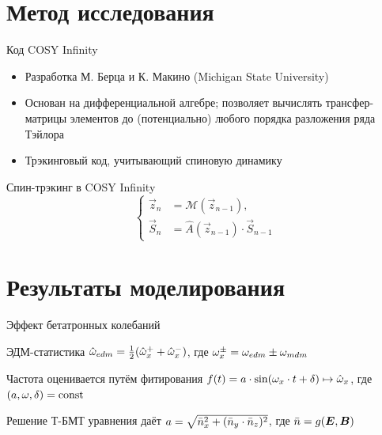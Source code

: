 \documentclass[14pt]{beamer}
\begin{document}
\section{Метод исследования}
\begin{frame}{Код COSY Infinity}
	\begin{itemize}
		\item Разработка М. Берца и К. Макино (Michigan State University)
		\item Основан на дифференциальной алгебре; позволяет вычислять трансфер-матрицы элементов до (потенциально) любого порядка разложения ряда Тэйлора
		\item Трэкинговый код, учитывающий спиновую динамику
	\end{itemize}
\end{frame}
\begin{frame}{Спин-трэкинг в COSY Infinity} 
	\[
	\begin{cases}
	\vec{z}_n &= \mathcal{M}(\vec{z}_{n-1}), \\
	\vec{S}_n &= \hat A(\vec z_{n-1})\cdot \vec S_{n-1}
	\end{cases}
	\]
\end{frame}

\section{Результаты моделирования}
\begin{frame}{Эффект бетатронных колебаний}
\begin{block}{ЭДМ-статистика}
	$\hat{\omega}_{edm} = \frac12(\hat{\omega}_x^+ + \hat{\omega}_x^-)$, где $\omega_x^\pm = \omega_{edm} \pm \omega_{mdm}$
\end{block}
\begin{block}{Частота оценивается путём фитирования}
	$f(t) = a\cdot\sin(\omega_x\cdot t + \delta) \mapsto \hat{\omega}_x$, где $(a,\omega, \delta) = \mathrm{const}$
\end{block}
\begin{block}{Решение Т-БМТ уравнения даёт}
	$a = \sqrt{\bar n_x^2 + (\bar n_y\cdot\bar n_z)^2}$, где $\bar n = g(\boldsymbol E, \boldsymbol B)$
\end{block}
\end{frame}
\end{document}
